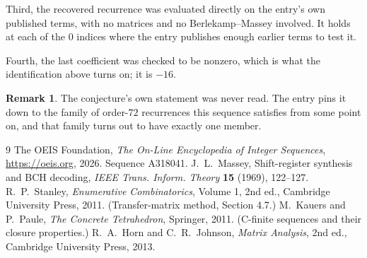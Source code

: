 \documentclass[11pt,a4paper]{article}
\theoremstyle{plain}
\theoremstyle{definition}
\newtheorem{remark}[theorem]{Remark}
\begin{document}
Third, the recovered recurrence was evaluated directly on the entry's own published terms, with
no matrices and no Berlekamp--Massey involved. It holds at each of the $0$ indices where
the entry publishes enough earlier terms to test it.

Fourth, the last coefficient was checked to be nonzero, which is what the identification above
turns on; it is $-16$.

\begin{remark}
The conjecture's own statement was never read. The entry pins it down to the family of
order-$72$ recurrences this sequence satisfies from some point on, and that family turns
out to have exactly one member.
\end{remark}

\begin{thebibliography}{9}
 The OEIS Foundation, \emph{The On-Line Encyclopedia of Integer
Sequences}, \url{https://oeis.org}, 2026. Sequence A318041.
 J.~L.~Massey, Shift-register synthesis and BCH decoding, \emph{IEEE
Trans. Inform. Theory} \textbf{15} (1969), 122--127.
 R.~P.~Stanley, \emph{Enumerative Combinatorics}, Volume 1, 2nd ed.,
Cambridge University Press, 2011. (Transfer-matrix method, Section 4.7.)
 M.~Kauers and P.~Paule, \emph{The Concrete Tetrahedron}, Springer, 2011.
(C-finite sequences and their closure properties.)
 R.~A.~Horn and C.~R.~Johnson, \emph{Matrix Analysis}, 2nd ed., Cambridge
University Press, 2013.
\end{thebibliography}
\end{document}
